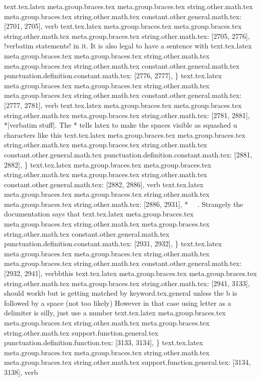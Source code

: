 {{{{{{{{{{{{{{{{{{{{{{{{{{{{{{{{{{{{{{{{{{{{{{{{{{{{{{{{{{{{{{{{{{{{{{{{{{{{{{{{{{{{{{{{{{{text.tex.latex meta.group.braces.tex meta.group.braces.tex string.other.math.tex meta.group.braces.tex string.other.math.tex constant.other.general.math.tex: [2701, 2705], {verb}
text.tex.latex meta.group.braces.tex meta.group.braces.tex string.other.math.tex meta.group.braces.tex string.other.math.tex: [2705, 2776], {!verbatim statements! in it.  It is also legal to have a sentence with }
text.tex.latex meta.group.braces.tex meta.group.braces.tex string.other.math.tex meta.group.braces.tex string.other.math.tex constant.other.general.math.tex punctuation.definition.constant.math.tex: [2776, 2777], {\}
text.tex.latex meta.group.braces.tex meta.group.braces.tex string.other.math.tex meta.group.braces.tex string.other.math.tex constant.other.general.math.tex: [2777, 2781], {verb}
text.tex.latex meta.group.braces.tex meta.group.braces.tex string.other.math.tex meta.group.braces.tex string.other.math.tex: [2781, 2881], {*|verbatim stuff|.  The * tells latex to make the spaces visible as squashed u characters like this }
text.tex.latex meta.group.braces.tex meta.group.braces.tex string.other.math.tex meta.group.braces.tex string.other.math.tex constant.other.general.math.tex punctuation.definition.constant.math.tex: [2881, 2882], {\}
text.tex.latex meta.group.braces.tex meta.group.braces.tex string.other.math.tex meta.group.braces.tex string.other.math.tex constant.other.general.math.tex: [2882, 2886], {verb}
text.tex.latex meta.group.braces.tex meta.group.braces.tex string.other.math.tex meta.group.braces.tex string.other.math.tex: [2886, 2931], {*~ ~.  Strangely the documentation says that }
text.tex.latex meta.group.braces.tex meta.group.braces.tex string.other.math.tex meta.group.braces.tex string.other.math.tex constant.other.general.math.tex punctuation.definition.constant.math.tex: [2931, 2932], {\}
text.tex.latex meta.group.braces.tex meta.group.braces.tex string.other.math.tex meta.group.braces.tex string.other.math.tex constant.other.general.math.tex: [2932, 2941], {verbbthis}
text.tex.latex meta.group.braces.tex meta.group.braces.tex string.other.math.tex meta.group.braces.tex string.other.math.tex: [2941, 3133], { should workb but  is getting matched by keyword.tex.general unless the b is followed by  a space (not too likely) However in that case using letter as a delimiter is silly, just use a number }
text.tex.latex meta.group.braces.tex meta.group.braces.tex string.other.math.tex meta.group.braces.tex string.other.math.tex support.function.general.tex punctuation.definition.function.tex: [3133, 3134], {\}
text.tex.latex meta.group.braces.tex meta.group.braces.tex string.other.math.tex meta.group.braces.tex string.other.math.tex support.function.general.tex: [3134, 3138], {verb}
}}}}}}}}}}}}}}}}}}}}}}}}}}}}}}}}}}}}}}}}}}}}}}}}}}}}}}}}}}}}}}}}}}}}}}}}}}}}}}}}}}}}}}}}}}}}}}}

